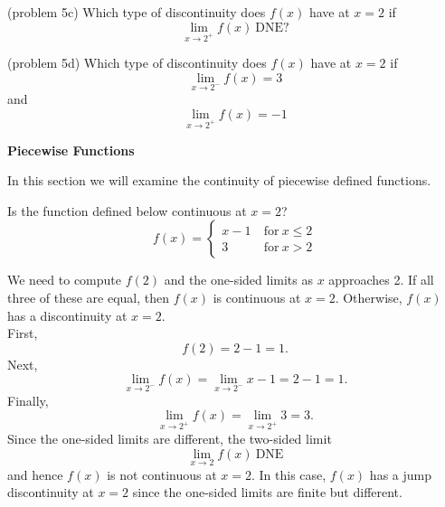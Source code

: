 \documentclass{ximera}
\begin{document}
\begin{problem}(problem 5c)
Which type of discontinuity does $f(x)$ have at $x=2$ if
\[
\lim_{x \to 2^+} f(x) \ \text{DNE}?
\]

\begin{multipleChoice}
\end{multipleChoice}
\end{problem}

\begin{problem}(problem 5d)
Which type of discontinuity does $f(x)$ have at $x=2$ if
\[
\lim_{x \to 2^-} f(x) = 3
\]
and
\[
\lim_{x \to 2^+} f(x) = -1
\]
\begin{multipleChoice}
\end{multipleChoice}
\end{problem}



\begin{center}
\textbf{Piecewise Functions}
\end{center}

In this section we will examine the continuity of piecewise defined functions.

\begin{example}[example 6]
Is the function defined below continuous at $x = 2$?
\[
f(x) = \left\{
     \begin{array}{lr}
       x-1 & \ \text{for} \  x \leq 2 \\
       3 & \ \text{for} \ x > 2
     \end{array}
   \right.
\]


We need to  compute $f(2)$ and the one-sided limits as $x$ approaches 2.
If all three of these are equal, then $f(x)$ is continuous at $x=2$.
Otherwise, $f(x)$ has a discontinuity at $x=2$.\\
First, 
\[
f(2) = 2-1 = 1.
\]
Next,  
\[\lim_{x \to 2^-} f(x) = \lim_{x \to 2^-} x-1 = 2-1 = 1.\]
Finally,
\[\lim_{x \to 2^+} f(x) = \lim_{x \to 2^+}3 = 3.\]
Since the one-sided limits are different, the two-sided limit
\[
\lim_{x \to 2} f(x) \ \text{DNE}
\]
and hence $f(x)$ is not continuous at $x = 2$.
In this case, $f(x)$ has a jump discontinuity at $x=2$ since the one-sided limits are finite but different.
\end{example}
\end{document}
